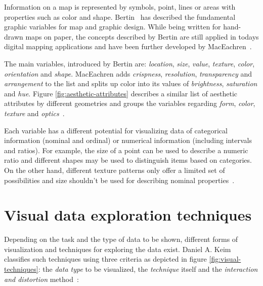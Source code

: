 Information on a map is represented by symbols, point, lines or areas with properties such as color and shape. Bertin~\cite{bertin67graphics, bertin83graphics} has described the fundamental graphic variables for map and graphic design. While being written for hand-drawn maps on paper, the concepts described by Bertin are still applied in todays digital mapping applications and have been further developed by MacEachren~\cite{MacEachren95maps}.

The main variables, introduced by Bertin are: \textit{location}, \textit{size}, \textit{value}, \textit{texture}, \textit{color}, \textit{orientation} and \textit{shape}. MacEachren adds \textit{crispness}, \textit{resolution}, \textit{transparency} and \textit{arrangement} to the list and splits up color into its values of \textit{brightness}, \textit{saturation} and \textit{hue}. Figure \ref{fig:aesthetic-attributes} describes a similar list of aesthetic attributes by different geometries and groups the variables regarding \textit{form}, \textit{color}, \textit{texture} and \textit{optics}~\cite{Wilkinson05grammar}.

Each variable has a different potential for visualizing data of categorical information (nominal and ordinal) or numerical information (including intervals and ratios). For example, the size of a point can be used to describe a numeric ratio and different shapes may be used to distinguish items based on categories. On the other hand, different texture patterns only offer a limited set of possibilities and size shouldn't be used for describing nominal properties~\cite{noellenburg11geovis, MacEachren95maps}. 

\section{Visual data exploration techniques}
\label{vis-data-techniques}

Depending on the task and the type of data to be shown, different forms of visualization and techniques for exploring the data exist. Daniel A. Keim~\cite{keim2001vis} classifies such techniques using three criteria as depicted in figure \ref{fig:visual-techniques}: the \textit{data type} to be visualized, the \textit{technique} itself and the \textit{interaction and distortion} method~\cite{Delort10vis}:


